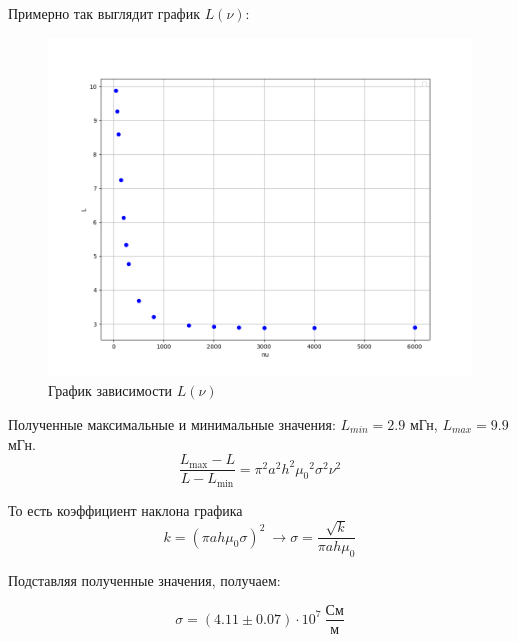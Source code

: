 \documentclass[a4paper, 12pt]{article}
\begin{document}
	Примерно так выглядит график $L(\nu)$:
	
	\begin{figure}[H]
		\centering
		\includegraphics[width = \textwidth]{data/data6}
		\caption{График зависимости $L(\nu)$}
	\end{figure}
	
	Полученные максимальные и минимальные значения: $L_{min} = 2.9$ мГн, $L_{max} = 9.9$ мГн.
	\begin{equation*}
		\frac{L_{\max} - L}{L - L_{\min}} = \pi ^2 a^2 h^2 {\mu_0}^2 \sigma^2 \nu^2
	\end{equation*}
	
	То есть коэффициент наклона графика
	\[k = (\pi ah\mu_0 \sigma)^2 \ \rightarrow \sigma = \frac{\sqrt{k}}{\pi ah \mu_0}\]
	
	Подставляя полученные значения, получаем:
	
	\begin{equation}
		\sigma = (4.11 \pm 0.07) \cdot 10^7  \ \frac{\text{См}}{\text{м}}
	\end{equation}
	
\end{document}
